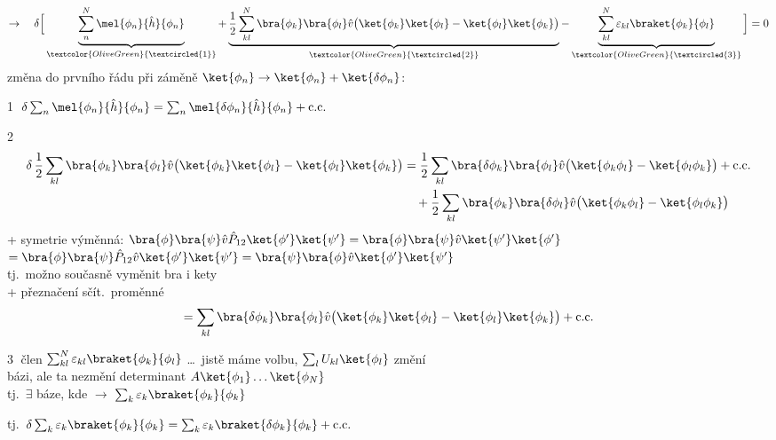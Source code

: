 \[
  \to\quad \delta\Big[\underbrace{\sum_n^N\mel{\phi_n}{\hat h}{\phi_n}}_{\textcolor{OliveGreen}{\textcircled{\scriptsize 1}}}
  + \underbrace{\frac12\sum_{kl}^N\bra{\phi_k}\bra{\phi_l}\hat v\big(\ket{\phi_k}\ket{\phi_l} - \ket{\phi_l}\ket{\phi_k}\big)}_{\textcolor{OliveGreen}{\textcircled{\scriptsize 2}}}
  - \underbrace{\sum_{kl}^N\varepsilon_{kl}\braket{\phi_k}{\phi_l}}_{\textcolor{OliveGreen}{\textcircled{\scriptsize 3}}}\Big] = 0
\]
změna do prvního řádu při záměně $\ket{\phi_n}\to\ket{\phi_n} + \ket{\delta\phi_n}$:

\textcolor{OliveGreen}{\textcircled{1}} \quad $\delta\sum_n\mel{\phi_n}{\hat h}{\phi_n} = \sum_n\mel{\delta\phi_n}{\hat h}{\phi_n} + \text{c.c.}$

\textcolor{OliveGreen}{\textcircled{2}}
\begin{align*}
  \delta\,\frac12\sum_{kl}\bra{\phi_k}\bra{\phi_l}\hat v\big(\ket{\phi_k}\ket{\phi_l} - \ket{\phi_l}\ket{\phi_k}\big)
  &= \frac12\sum_{kl}\bra{\delta\phi_k}\bra{\phi_l}\hat v\big(\ket{\phi_k\phi_l} - \ket{\phi_l\phi_k}\big) + \text{c.c.} \\
  &\quad + \frac12\sum_{kl}\bra{\phi_k}\bra{\delta\phi_l}\hat v\big(\ket{\phi_k\phi_l} - \ket{\phi_l\phi_k}\big)
\end{align*}
+ symetrie výměnná: \quad
$\bra{\phi}\bra{\psi}\hat v\hat P_{12}\ket{\phi'}\ket{\psi'} = \bra{\phi}\bra{\psi}\hat v\ket{\psi'}\ket{\phi'}$ \\
\hspace*{4.25cm} $= \bra{\phi}\bra{\psi}\hat P_{12}\hat v\ket{\phi'}\ket{\psi'} = \bra{\psi}\bra{\phi}\hat v\ket{\phi'}\ket{\psi'}$ \\
\hspace*{9cm} tj.\ možno současně vyměnit bra i kety \\
+ přeznačení sčít.\ proměnné
\[
  = \sum_{kl}\bra{\delta\phi_k}\bra{\phi_l}\hat v\big(\ket{\phi_k}\ket{\phi_l} - \ket{\phi_l}\ket{\phi_k}\big) + \text{c.c.}
\]

\textcolor{OliveGreen}{\textcircled{3}} \quad člen $\sum_{kl}^N\varepsilon_{kl}\braket{\phi_k}{\phi_l}$ \dots\ jistě máme volbu, $\sum_lU_{kl}\ket{\phi_l}$ změní \\
\quad bázi, ale ta nezmění determinant $A\ket{\phi_1}\dots\ket{\phi_N}$ \\
\quad tj.\ $\exists$ báze, kde \quad $\longrightarrow$ \quad $\sum_k\varepsilon_k\braket{\phi_k}{\phi_k}$

tj.\ \quad $\delta\sum_k\varepsilon_k\braket{\phi_k}{\phi_k} = \sum_k\varepsilon_k\braket{\delta\phi_k}{\phi_k} + \text{c.c.}$


